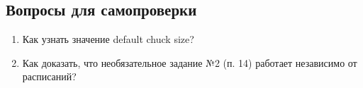 \subsection{Вопросы для самопроверки}
\begin{enumerate}
    \item Как узнать значение default chuck size?
    \item Как доказать, что необязательное задание №2 (п. 14) работает независимо от расписаний?
\end{enumerate}
